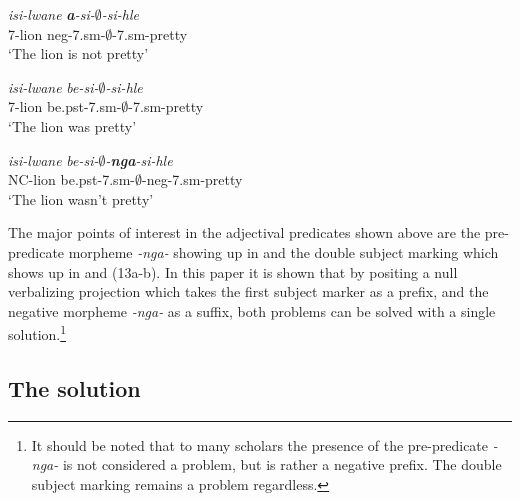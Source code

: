 \documentclass[output=paper]{langsci/langscibook}
\newcommand{\nga}[0]{\textit{-nga- }}
\begin{document}
{\begin{exe}
\begin{xlist}
\ex \gll \textit{isi-lwane} \textit{\textbf{a}-si-$\emptyset$-si-hle}\\
       7-lion {\sc neg}-7.{\sc sm}-$\emptyset$-7.{\sc sm}-pretty\\
    \glt `The lion is not pretty' 
\end{xlist}
\end{exe}

\begin{exe}
\ex \begin{xlist}
\ex \gll \textit{isi-lwane} \textit{be-si-$\emptyset$-si-hle}\\
       7-lion be.{\sc pst}-7.{\sc sm}-$\emptyset$-7.{\sc sm}-pretty\\
    \glt `The lion was pretty' 

\ex \gll \textit{isi-lwane} \textit{be-si-$\emptyset$-\textbf{nga}-si-hle}\\
       NC-lion be.{\sc pst}-7.{\sc sm}-$\emptyset$-{\sc neg}-7.{\sc sm}-pretty\\
    \glt `The lion wasn't pretty' 
\end{xlist}
\end{exe}

The major points of interest in the adjectival predicates shown above are the pre-predicate morpheme \nga showing up in  and the double subject marking which shows up in  and (13a-b). In this paper it is shown that by positing a null verbalizing projection which takes the first subject marker as a prefix, and the negative morpheme \nga as a suffix, both problems can be solved with a single solution.\footnote{It should be noted that to many scholars the presence of the pre-predicate \nga is not considered a problem, but is rather a negative prefix. The double subject marking remains a problem regardless.}

\subsection {The solution}

}
\end{document}
